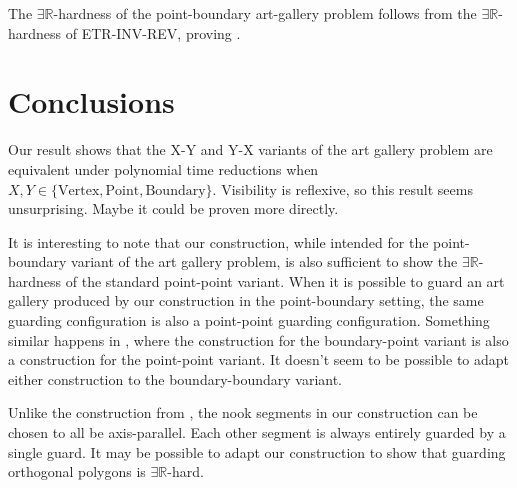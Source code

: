 \documentclass[11pt]{article}
\newcommand{\rr}{\mathbb R}
\theoremstyle{plain}
\theoremstyle{definition}
\numberwithin{theorem}{section}
\begin{document}
The $\exists\rr$-hardness of the point-boundary art-gallery problem follows from the $\exists\rr$-hardness of ETR-INV-REV, proving .

\section{Conclusions}\label{Conclusion}

Our result shows that the X-Y and Y-X variants of the art gallery problem are equivalent under polynomial time reductions when $X, Y\in \{\text{Vertex}, \text{Point}, \text{Boundary}\}$. Visibility is reflexive, so this result seems unsurprising. Maybe it could be proven more directly.

It is interesting to note that our construction, while intended for the point-boundary variant of the art gallery problem, is also sufficient to show the $\exists\rr$-hardness of the standard point-point variant. When it is possible to guard an art gallery produced by our construction in the point-boundary setting, the same guarding configuration is also a point-point guarding configuration. Something similar happens in \cite{ExistsRHardness}, where the construction for the boundary-point variant is also a construction for the point-point variant. It doesn't seem to be possible to adapt either construction to the boundary-boundary variant.

Unlike the construction from \cite{ExistsRHardness}, the nook segments in our construction can be chosen to all be axis-parallel. Each other segment is always entirely guarded by a single guard. It may be possible to adapt our construction to show that guarding orthogonal polygons is $\exists\rr$-hard.
\end{document}
